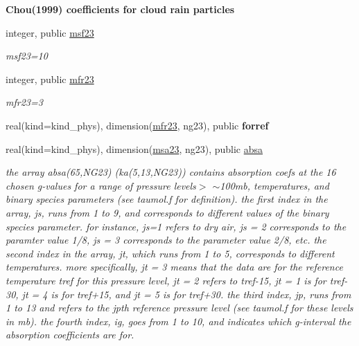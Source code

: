 \begin{Indent}\textbf{ Chou(1999) coefficients for cloud rain particles}\par
\begin{DoxyCompactItemize}
\item 
integer, public \hyperlink{group__module__radsw__kgbnn_gab96959c26232963a568609451483843e}{msf23}
\begin{DoxyCompactList}\small\item\em msf23=10 \end{DoxyCompactList}\item 
integer, public \hyperlink{group__module__radsw__kgbnn_ga78b43ec4bc2afd4f520480a8410d9df5}{mfr23}
\begin{DoxyCompactList}\small\item\em mfr23=3 \end{DoxyCompactList}\item 
real(kind=kind\+\_\+phys), dimension(\hyperlink{group__module__radsw__kgbnn_ga78b43ec4bc2afd4f520480a8410d9df5}{mfr23}, ng23), public {\bfseries forref}
\item 
real(kind=kind\+\_\+phys), dimension(\hyperlink{namespacemodule__radsw__kgb23_a744e7ef73b8d3cc01ff9c6a6010d95d7}{msa23}, ng23), public \hyperlink{group__module__radsw__kgbnn_ga2541e41c7d445a2ce73283e2fb76270c}{absa}
\begin{DoxyCompactList}\small\item\em the array absa(65,\+N\+G23) (ka(5,13,\+N\+G23)) contains absorption coefs at the 16 chosen g-\/values for a range of pressure levels$>$ $\sim$100mb, temperatures, and binary species parameters (see taumol.\+f for definition). the first index in the array, js, runs from 1 to 9, and corresponds to different values of the binary species parameter. for instance, js=1 refers to dry air, js = 2 corresponds to the paramter value 1/8, js = 3 corresponds to the parameter value 2/8, etc. the second index in the array, jt, which runs from 1 to 5, corresponds to different temperatures. more specifically, jt = 3 means that the data are for the reference temperature tref for this pressure level, jt = 2 refers to tref-\/15, jt = 1 is for tref-\/30, jt = 4 is for tref+15, and jt = 5 is for tref+30. the third index, jp, runs from 1 to 13 and refers to the jpth reference pressure level (see taumol.\+f for these levels in mb). the fourth index, ig, goes from 1 to 10, and indicates which g-\/interval the absorption coefficients are for. \end{DoxyCompactList}\item 

\end{DoxyCompactItemize}
\end{Indent}
